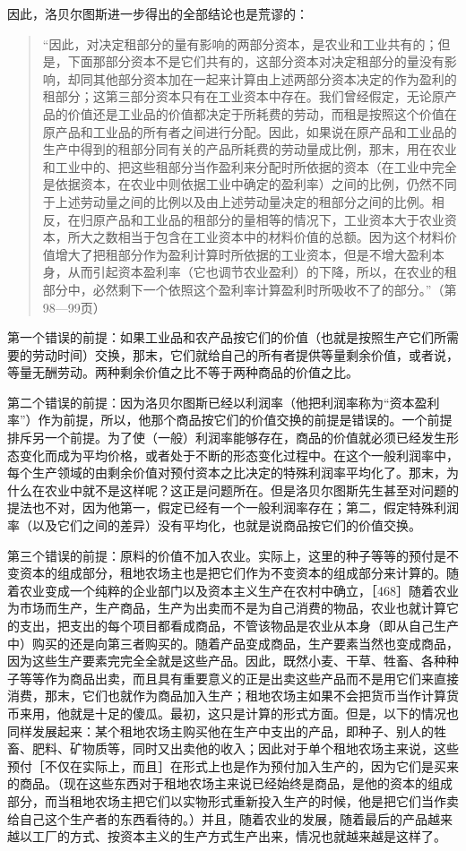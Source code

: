 因此，洛贝尔图斯进一步得出的全部结论也是荒谬的：

\begin{quote}{“因此，对决定租部分的量有影响的两部分资本，是农业和工业共有的；但是，下面那部分资本不是它们共有的，这部分资本对决定租部分的量没有影响，却同其他部分资本加在一起来计算由上述两部分资本决定的作为盈利的租部分；这第三部分资本只有在工业资本中存在。我们曾经假定，无论原产品的价值还是工业品的价值都决定于所耗费的劳动，而租是按照这个价值在原产品和工业品的所有者之间进行分配。因此，如果说在原产品和工业品的生产中得到的租部分同有关的产品所耗费的劳动量成比例，那末，用在农业和工业中的、把这些租部分当作盈利来分配时所依据的资本（在工业中完全是依据资本，在农业中则依据工业中确定的盈利率）之间的比例，仍然不同于上述劳动量之间的比例以及由上述劳动量决定的租部分之间的比例。相反，在归原产品和工业品的租部分的量相等的情况下，工业资本大于农业资本，所大之数相当于包含在工业资本中的材料价值的总额。因为这个材料价值增大了把租部分作为盈利计算时所依据的工业资本，但是不增大盈利本身，从而引起资本盈利率（它也调节农业盈利）的下降，所以，在农业的租部分中，必然剩下一个依照这个盈利率计算盈利时所吸收不了的部分。”（第98—99页）}\end{quote}

第一个错误的前提：如果工业品和农产品按它们的价值（也就是按照生产它们所需要的劳动时间）交换，那末，它们就给自己的所有者提供等量剩余价值，或者说，等量无酬劳动。两种剩余价值之比不等于两种商品的价值之比。

第二个错误的前提：因为洛贝尔图斯已经以利润率（他把利润率称为“资本盈利率”）作为前提，所以，他那个商品按它们的价值交换的前提是错误的。一个前提排斥另一个前提。为了使（一般）利润率能够存在，商品的价值就必须已经发生形态变化而成为平均价格，或者处于不断的形态变化过程中。在这个一般利润率中，每个生产领域的由剩余价值对预付资本之比决定的特殊利润率平均化了。那末，为什么在农业中就不是这样呢？这正是问题所在。但是洛贝尔图斯先生甚至对问题的提法也不对，因为他第一，假定已经有一个一般利润率存在；第二，假定特殊利润率（以及它们之间的差异）没有平均化，也就是说商品按它们的价值交换。

第三个错误的前提：原料的价值不加入农业。实际上，这里的种子等等的预付是不变资本的组成部分，租地农场主也是把它们作为不变资本的组成部分来计算的。随着农业变成一个纯粹的企业部门以及资本主义生产在农村中确立，［468］随着农业为市场而生产，生产商品，生产为出卖而不是为自己消费的物品，农业也就计算它的支出，把支出的每个项目都看成商品，不管该物品是农业从本身（即从自己生产中）购买的还是向第三者购买的。随着产品变成商品，生产要素当然也变成商品，因为这些生产要素完完全全就是这些产品。因此，既然小麦、干草、牲畜、各种种子等等作为商品出卖，而且具有重要意义的正是出卖这些产品而不是用它们来直接消费，那末，它们也就作为商品加入生产；租地农场主如果不会把货币当作计算货币来用，他就是十足的傻瓜。最初，这只是计算的形式方面。但是，以下的情况也同样发展起来：某个租地农场主购买他在生产中支出的产品，即种子、别人的牲畜、肥料、矿物质等，同时又出卖他的收入；因此对于单个租地农场主来说，这些预付［不仅在实际上，而且］在形式上也是作为预付加入生产的，因为它们是买来的商品。（现在这些东西对于租地农场主来说已经始终是商品，是他的资本的组成部分，而当租地农场主把它们以实物形式重新投入生产的时候，他是把它们当作卖给自己这个生产者的东西看待的。）并且，随着农业的发展，随着最后的产品越来越以工厂的方式、按资本主义的生产方式生产出来，情况也就越来越是这样了。

